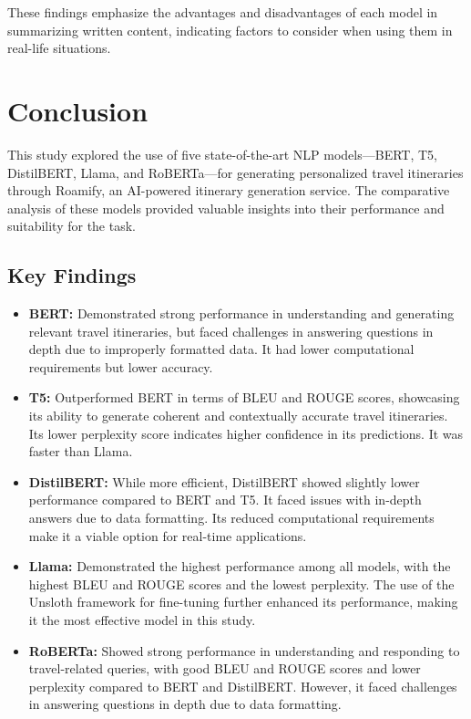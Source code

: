 \documentclass[conference]{IEEEtran}
\begin{document}
    These findings emphasize the advantages and disadvantages of each model in summarizing written content, indicating factors to consider when using them in real-life situations.


\section{Conclusion}

    This study explored the use of five state-of-the-art NLP models—BERT, T5, DistilBERT, Llama, and RoBERTa—for generating personalized travel itineraries through Roamify, an AI-powered itinerary generation service. The comparative analysis of these models provided valuable insights into their performance and suitability for the task.

    \subsection{Key Findings}

        \begin{itemize}
            \item \textbf{BERT:} Demonstrated strong performance in understanding and generating relevant travel itineraries, but faced challenges in answering questions in depth due to improperly formatted data. It had lower computational requirements but lower accuracy.
            \item \textbf{T5:} Outperformed BERT in terms of BLEU and ROUGE scores, showcasing its ability to generate coherent and contextually accurate travel itineraries. Its lower perplexity score indicates higher confidence in its predictions. It was faster than Llama.
            \item \textbf{DistilBERT:} While more efficient, DistilBERT showed slightly lower performance compared to BERT and T5. It faced issues with in-depth answers due to data formatting. Its reduced computational requirements make it a viable option for real-time applications.
            \item \textbf{Llama:} Demonstrated the highest performance among all models, with the highest BLEU and ROUGE scores and the lowest perplexity. The use of the Unsloth framework for fine-tuning further enhanced its performance, making it the most effective model in this study.
            \item \textbf{RoBERTa:} Showed strong performance in understanding and responding to travel-related queries, with good BLEU and ROUGE scores and lower perplexity compared to BERT and DistilBERT. However, it faced challenges in answering questions in depth due to data formatting.
        \end{itemize}
\end{document}
